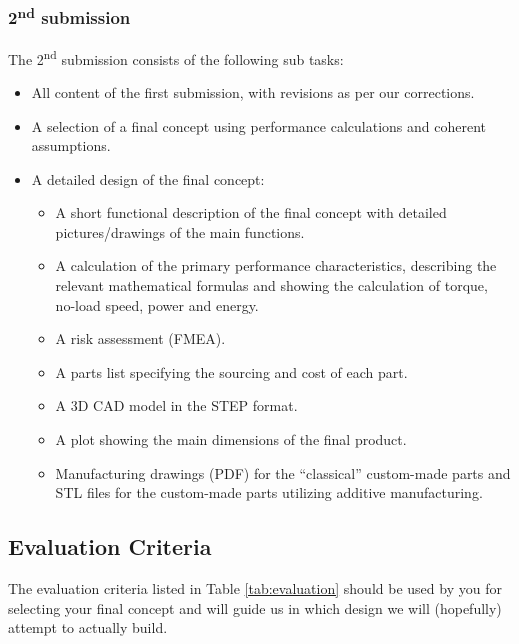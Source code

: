 \documentclass[headinclude=true]{scrartcl}
\begin{document}
\subsubsection{2\textsuperscript{nd} submission}
The 2\textsuperscript{nd} submission consists of the following sub tasks:
\begin{itemize}
 \item All content of the first submission, with revisions as per our corrections.
 \item A selection of a final concept using performance calculations and coherent assumptions.
 \item A detailed design of the final concept:
 \begin{itemize}
  \item A short functional description of the final concept with detailed pictures/drawings of the main functions.
  \item A calculation of the primary performance characteristics, describing the relevant mathematical formulas and showing the calculation of torque, no-load speed, power and energy.
  \item A risk assessment (FMEA).
  \item A parts list specifying the sourcing and cost of each part.
  \item A 3D CAD model in the STEP format.
  \item A plot showing the main dimensions of the final product.
  \item Manufacturing drawings (PDF) for the ``classical'' custom-made parts and STL files for the custom-made parts utilizing additive manufacturing.
 \end{itemize}

\end{itemize}

\subsection{Evaluation Criteria}
\label{sec:evaluation}

The evaluation criteria listed in Table \ref{tab:evaluation} should be used by you for selecting your final concept and will guide us in which design we will (hopefully) attempt to actually build.
\end{document}
